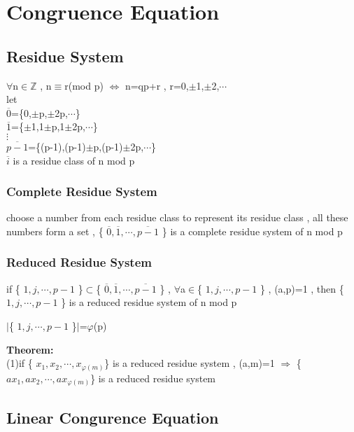 \documentclass{ctexart}
\begin{document}
\newpage
\section{Congruence Equation}
\subsection{Residue System}
\(\forall\)n\(\in\)\(\mathbb{Z}\) , n\(\equiv\)r(mod p) \(\Leftrightarrow\) n=qp+r , r=0,\(\pm\)1,\(\pm\)2,\(\cdots\)
\\let
\\\(\overline{0}\)=\{0,\(\pm\)p,\(\pm\)2p,\(\cdots\)\}
\\\(\overline{1}\)=\{\(\pm\)1,1\(\pm\)p,1\(\pm\)2p,\(\cdots\)\}
\\\(\vdots\)
\\\(\overline{p-1}\)=\{(p-1),(p-1)\(\pm\)p,(p-1)\(\pm\)2p,\(\cdots\)\}
\vspace{12 pt}
\\\(\overline{i}\) is a residue class of n mod p

\vspace{12 pt}
\subsubsection{Complete Residue System}
choose a number from each residue class to represent its residue class , all these numbers form a set  
, \{ \( \overline{0},\overline{1},\cdots,\overline{p-1} \) \} is  a complete residue system of n mod p

\subsubsection{Reduced Residue System}
if  \{ \( {1},{j},\cdots,{p-1} \) \}\(\subset\)\{ \( \overline{0},\overline{1},\cdots,\overline{p-1} \) \} , \(\forall\)a\(\in\)\{ \( {1},{j},\cdots,{p-1} \) \} , 
(a,p)=1 , then \{ \( {1},{j},\cdots,{p-1} \) \} is a reduced residue system of n mod p

\(\vert\)\{ \( 1,{j},\cdots,{p-1} \) \}\(\vert\)=\(\varphi\)(p)

\textbf{Theorem:}
\\(1)if \{ \(x_1,x_2,\cdots,x_{\varphi (m)}\)\} is a reduced residue system , (a,m)=1 \(\Rightarrow\) \{ \(ax_1,ax_2,\cdots,ax_{\varphi (m)}\)\} is a reduced residue system



\vspace{12 pt}
\subsection{Linear Congurence Equation}
\end{document}
